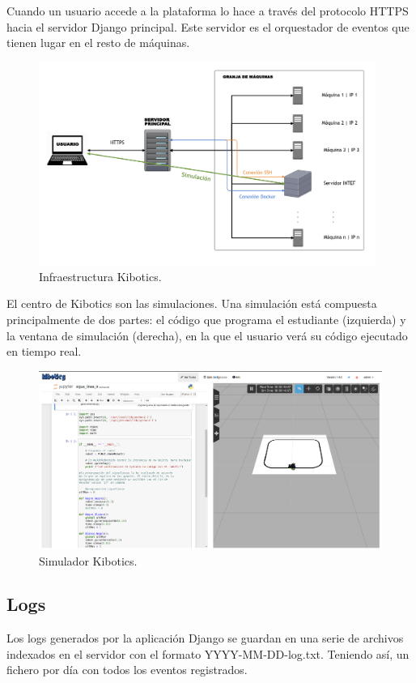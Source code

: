 \documentclass[11pt,a4paper]{book}
\begin{document}
				Cuando un usuario accede a la plataforma lo hace a través del protocolo HTTPS hacia el servidor Django principal. Este servidor es el orquestador de eventos que tienen lugar en el resto de máquinas.
				\begin{figure}[H]
					\centering
					\includegraphics[width=11cm, keepaspectratio]{img/kibotics-infraestructura.png}
					\caption{Infraestructura Kibotics.}
					\label{fig:infraestructura_kibotics}
				\end{figure}
				El centro de Kibotics son las simulaciones. Una simulación está compuesta principalmente de dos partes: el código que programa el estudiante (izquierda) y la ventana de simulación (derecha), en la que el usuario verá su código ejecutado en tiempo real.

				\begin{figure}[H]
					\centering
					\includegraphics[width=15cm, keepaspectratio]{img/simulacion_kibotics.png}
					\caption{Simulador Kibotics.}
					\label{fig:simulacion_kibotics}
				\end{figure}

			\subsection{Logs}
			Los logs generados por la aplicación Django se guardan en una serie de archivos indexados en el servidor con el formato YYYY-MM-DD-log.txt. Teniendo así, un fichero por día con todos los eventos registrados.
			
\end{document}
